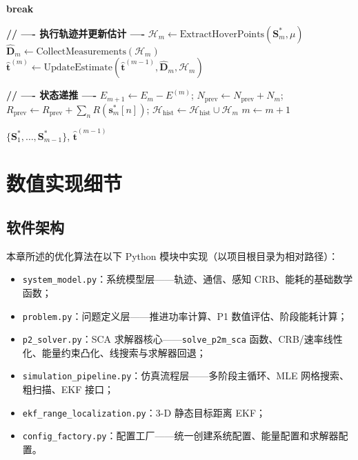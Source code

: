 \begin{algorithm}[htbp]
\begin{algorithmic}[1]
        \STATE \textbf{break} 
    \ENDIF

    \STATE \textbf{// ---- 执行轨迹并更新估计 ----}
    \STATE $\mathcal{H}_m\gets\text{ExtractHoverPoints}(\mathbf{S}_m^*,\mu)$
    \STATE $\widehat{\mathbf{D}}_m\gets\text{CollectMeasurements}(\mathcal{H}_m)$
    \STATE $\hat{\mathbf{t}}^{(m)}\gets\text{UpdateEstimate}(\hat{\mathbf{t}}^{(m-1)},\widehat{\mathbf{D}}_m,\mathcal{H}_m)$ 

    \STATE \textbf{// ---- 状态递推 ----}
    \STATE $E_{m+1}\gets E_m-E^{(m)}$;\;
        $N_{\mathrm{prev}}\gets N_{\mathrm{prev}}+N_m$;\;
        $R_{\mathrm{prev}}\gets R_{\mathrm{prev}}+\sum_{n}R(\mathbf{s}_m^*[n])$;\;
        $\mathcal{H}_{\mathrm{hist}}\gets\mathcal{H}_{\mathrm{hist}}\cup\mathcal{H}_m$
    \STATE $m\gets m+1$
\ENDWHILE

\medskip
\RETURN $\{\mathbf{S}_1^*,\ldots,\mathbf{S}_{m-1}^*\}$,\; $\hat{\mathbf{t}}^{(m-1)}$
\end{algorithmic}
\end{algorithm}

\section{数值实现细节}
\label{sec:implementation}

\subsection{软件架构}

本章所述的优化算法在以下 Python 模块中实现（以项目根目录为相对路径）：

\begin{itemize}
    \item \texttt{system\_model.py}：系统模型层——轨迹、通信、感知 CRB、能耗的基础数学函数；
    \item \texttt{problem.py}：问题定义层——推进功率计算、P1 数值评估、阶段能耗计算；
    \item \texttt{p2\_solver.py}：SCA 求解器核心——\texttt{solve\_p2m\_sca} 函数、CRB/速率线性化、能量约束凸化、线搜索与求解器回退；
    \item \texttt{simulation\_pipeline.py}：仿真流程层——多阶段主循环、MLE 网格搜索、粗扫描、EKF 接口；
    \item \texttt{ekf\_range\_localization.py}：3-D 静态目标距离 EKF；
    \item \texttt{config\_factory.py}：配置工厂——统一创建系统配置、能量配置和求解器配置。
\end{itemize}

